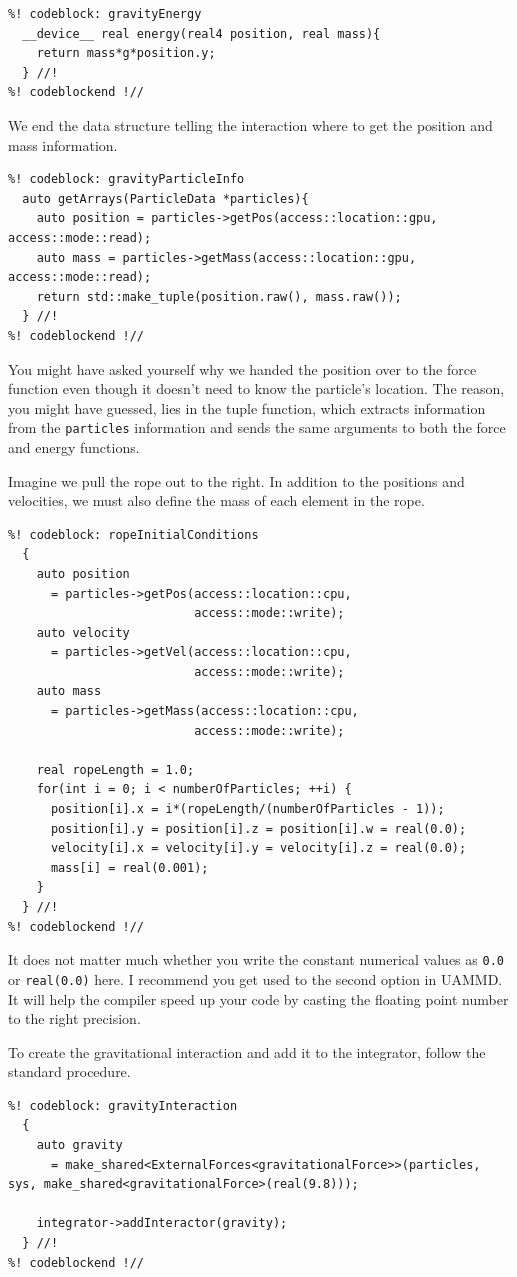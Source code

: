 \begin{lstlisting}
%! codeblock: gravityEnergy
  __device__ real energy(real4 position, real mass){
    return mass*g*position.y;
  } //!
%! codeblockend !//
\end{lstlisting}
We end the data structure telling the interaction where to get the position and
mass information.
\begin{lstlisting}
%! codeblock: gravityParticleInfo
  auto getArrays(ParticleData *particles){
    auto position = particles->getPos(access::location::gpu, access::mode::read);
    auto mass = particles->getMass(access::location::gpu, access::mode::read);
    return std::make_tuple(position.raw(), mass.raw());
  } //!
%! codeblockend !//
\end{lstlisting}
You might have asked yourself why we handed the position over to the force
function even though it doesn't need to know the particle's location. The reason,
you might have guessed, lies in the tuple function, which extracts information
from the \texttt{particles} information and sends the same arguments to both the
force and energy functions.

Imagine we pull the rope out to the right. In addition to the positions and
velocities, we must also define the mass of each element in the rope.
\begin{lstlisting}
%! codeblock: ropeInitialConditions
  {
    auto position
      = particles->getPos(access::location::cpu,
                          access::mode::write);
    auto velocity
      = particles->getVel(access::location::cpu,
                          access::mode::write);
    auto mass
      = particles->getMass(access::location::cpu,
                          access::mode::write);

    real ropeLength = 1.0;
    for(int i = 0; i < numberOfParticles; ++i) {
      position[i].x = i*(ropeLength/(numberOfParticles - 1));
      position[i].y = position[i].z = position[i].w = real(0.0);
      velocity[i].x = velocity[i].y = velocity[i].z = real(0.0);
      mass[i] = real(0.001);
    }
  } //!
%! codeblockend !//
\end{lstlisting}

It does not matter much whether you write the constant numerical values as 
\texttt{0.0} or \texttt{real(0.0)} here. I recommend you get used to the second 
option in UAMMD. It will help the compiler speed up your code by casting the 
floating point number to the right precision.

To create the gravitational interaction and add it to the integrator, follow the
standard procedure.
\begin{lstlisting}
%! codeblock: gravityInteraction
  {
    auto gravity
      = make_shared<ExternalForces<gravitationalForce>>(particles, sys, make_shared<gravitationalForce>(real(9.8)));

    integrator->addInteractor(gravity);
  } //!
%! codeblockend !//
\end{lstlisting}

